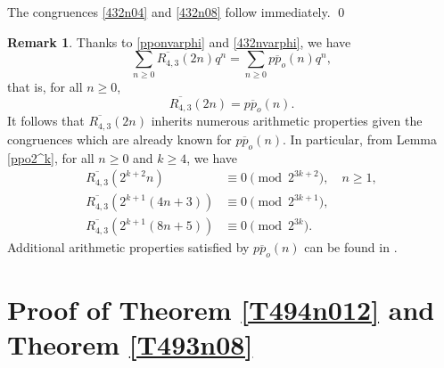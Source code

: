 \documentclass{amsart}
\theoremstyle{definition}
\newtheorem{remark}[theorem]{Remark}
\begin{document}
The congruences \eqref{432n04} and \eqref{432n08} follow immediately. \qed
\begin{remark}
\label{remark:ppo}
Thanks to \eqref{pponvarphi} and \eqref{432nvarphi}, we have 
\begin{equation*}
    \sum_{n\geq 0}\overline{R_{4,3}}(2n)q^n=\sum_{n\geq 0}\overline{pp_o}(n)q^n,
\end{equation*}
that is, 
for all $n\geq 0$,
$$\overline{R_{4,3}}(2n)=\overline{pp_o}(n).$$ 
It follows that $\overline{R_{4,3}}(2n)$ inherits numerous arithmetic properties given the congruences which are already known for $\overline{pp_o}(n)$. 
In particular, from Lemma \ref{ppo2^k}, for all $n\geq 0$ and $k\geq4$, we have 
    \begin{align*}
        \overline{R_{4,3}}(2^{k+2}n)&\equiv0\pmod{2^{3k+2}}, \quad n\geq1,\\
        \overline{R_{4,3}}(2^{k+1}(4n+3))&\equiv0\pmod{2^{3k+1}},\\
        \overline{R_{4,3}}(2^{k+1}(8n+5))&\equiv0\pmod{2^{3k}}.
    \end{align*}
Additional arithmetic properties satisfied by $\overline{pp_o}(n)$ can be found in \cite{Lin}.
\end{remark}

\section{Proof of Theorem \ref{T494n012} and Theorem \ref{T493n08}}
\end{document}
